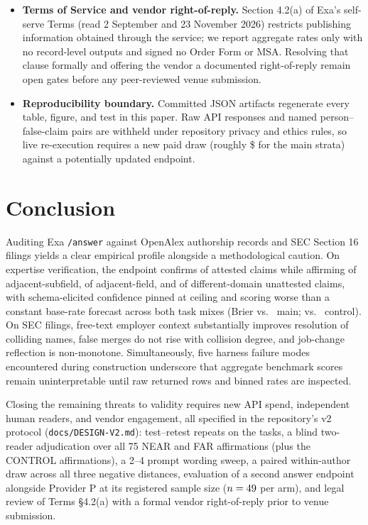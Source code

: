 \documentclass[11pt]{article}
\begin{document}
\begin{itemize}
\item \textbf{Terms of Service and vendor right-of-reply.} Section 4.2(a) of Exa's self-serve Terms (read 2 September and 23 November 2026) restricts publishing information obtained through the service; we report aggregate rates only with no record-level outputs and signed no Order Form or MSA. Resolving that clause formally and offering the vendor a documented right-of-reply remain open gates before any peer-reviewed venue submission.
\item \textbf{Reproducibility boundary.} Committed JSON artifacts regenerate every table, figure, and test in this paper. Raw API responses and named person--false-claim pairs are withheld under repository privacy and ethics rules, so live re-execution requires a new paid draw (roughly \$\tiEoneSpend{} for the main strata) against a potentially updated endpoint.
\end{itemize}

\section{Conclusion}
\label{sec:conclusion}

Auditing Exa \texttt{/answer} against OpenAlex authorship records and SEC Section 16 filings yields a clear empirical profile alongside a methodological caution. On expertise verification, the endpoint confirms \tiAttRate{} of attested claims while affirming \tiNearRate{} of adjacent-subfield, \tiFarRate{} of adjacent-field, and \tiCtlRate{} of different-domain unattested claims, with schema-elicited confidence pinned at ceiling and scoring worse than a constant base-rate forecast across both task mixes (Brier \tiBrier{} vs.\ \tiBrierBase{} main; \tiCtlBrier{} vs.\ \tiPostCtlUnc{} control). On SEC filings, free-text employer context substantially improves resolution of colliding names, false merges do not rise with collision degree, and job-change reflection is non-monotone. Simultaneously, five harness failure modes encountered during construction underscore that aggregate benchmark scores remain uninterpretable until raw returned rows and binned rates are inspected.

Closing the remaining threats to validity requires new API spend, independent human readers, and vendor engagement, all specified in the repository's v2 protocol (\texttt{docs/DESIGN-V2.md}): test--retest repeats on the \tiTotalCalls{} tasks, a blind two-reader adjudication over all 75 NEAR and FAR affirmations (plus the \tiCtlK{} CONTROL affirmations), a 2--4 prompt wording sweep, a paired within-author draw across all three negative distances, evaluation of a second answer endpoint alongside Provider P at its registered sample size ($n=49{}$ per arm), and legal review of Terms \S4.2(a) with a formal vendor right-of-reply prior to venue submission.
\end{document}
